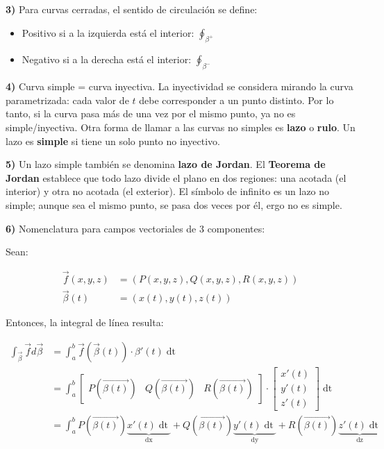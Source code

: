 \documentclass{article}
\begin{document}
\textbf{3)} Para curvas cerradas, el sentido de circulación se define:

\begin{itemize}
\item Positivo si a la izquierda está el interior: $\oint_{\beta^+}$
\item Negativo si a la derecha está el interior: $\oint_{\beta^-}$
\end{itemize}

\textbf{4)} Curva simple = curva inyectiva. La inyectividad se considera mirando la curva parametrizada: cada valor de $t$ debe corresponder a un punto distinto. Por lo tanto, si la curva pasa más de una vez por el mismo punto, ya no es simple/inyectiva. Otra forma de llamar a las curvas no simples es \textbf{lazo} o \textbf{rulo}. Un lazo es \textbf{simple} si tiene un solo punto no inyectivo.

\textbf{5)} Un lazo simple también se denomina \textbf{lazo de Jordan}. El \textbf{Teorema de Jordan} establece que todo lazo divide el plano en dos regiones: una acotada (el interior) y otra no acotada (el exterior). El símbolo de infinito es un lazo no simple; aunque sea el mismo punto, se pasa dos veces por él, ergo no es simple.

\textbf{6)} Nomenclatura para campos vectoriales de 3 componentes:

Sean:

\begin{align}
\overrightarrow{f}(x, y, z) &= (P(x,y,z), Q(x,y,z), R(x, y, z)) \\
\overrightarrow{\beta}(t) &= (x(t), y(t), z(t))
\end{align}

Entonces, la integral de línea resulta:

\begin{align}
\int_{\overrightarrow{\beta}} \overrightarrow{f} d\overrightarrow{\beta} &= \int_{a}^{b} \overrightarrow{f}(\overrightarrow{\beta}(t)) \cdot \beta'(t) \mathop{dt} \\
&= \int_{a}^{b} \begin{bmatrix}P(\overrightarrow{\beta(t)}) & Q(\overrightarrow{\beta(t)}) & R(\overrightarrow{\beta(t)})\end{bmatrix} \cdot \begin{bmatrix}x'(t) \\ y'(t) \\ z'(t)\end{bmatrix} \mathop{dt} \\
&= \int_{a}^{b} P(\overrightarrow{\beta(t)}) \underbrace{x'(t) \mathop{dt}}_{\mathop{dx}} + Q(\overrightarrow{\beta(t)}) \underbrace{y'(t) \mathop{dt}}_{\mathop{dy}} + R(\overrightarrow{\beta(t)}) \underbrace{z'(t) \mathop{dt}}_{\mathop{dz}}
\end{align}
\end{document}
